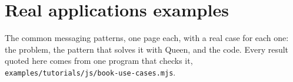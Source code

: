 
\chapter{Real applications examples}

The common messaging patterns, one page each, with a real case for each one: the problem, the
pattern that solves it with Queen, and the code. Every result quoted here comes from one program
that checks it, \texttt{examples/tutorials/js/book-use-cases.mjs}.













